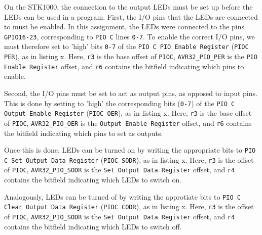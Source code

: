 On the STK1000, the connection to the output LEDs must be set up before the LEDs can be used in a program.
First, the I/O pins that the LEDs are connected to must be enabled.
In this assignment, the LEDs were connected to the pins \texttt{GPIO16-23}, corresponding to \texttt{PIO C} lines \texttt{0-7}.
To enable the correct I/O pins, we must therefore set to 'high' bits \texttt{0-7} of the \texttt{PIO C PIO Enable Register} (\texttt{PIOC PER}), as in listing x.
Here, \texttt{r3} is the base offset of \texttt{PIOC}, \texttt{AVR32\_PIO\_PER} is the \texttt{PIO Enable Register} offset, and \texttt{r6} contains the bitfield indicating which pins to enable.


Second, the I/O pins must be set to act as output pins, as opposed to input pins.
This is done by setting to 'high' the corresponding bits (\texttt{0-7}) of the \texttt{PIO C Output Enable Register} (\texttt{PIOC OER}), as in listing x.
Here, \texttt{r3} is the base offset of \texttt{PIOC}, \texttt{AVR32\_PIO\_OER} is the \texttt{Output Enable Register} offset, and \texttt{r6} contains the bitfield indicating which pins to set as outputs.


Once this is done, LEDs can be turned on by writing the appropriate bits to \texttt{PIO C Set Output Data Register} (\texttt{PIOC SODR}), as in listing x.
Here, \texttt{r3} is the offset of \texttt{PIOC}, \texttt{AVR32\_PIO\_SODR} is the \texttt{Set Output Data Register} offset, and \texttt{r4} contains the bitfield indicating which LEDs to switch on.


Analogously, LEDs can be turned of by writing the approtiate bits to \texttt{PIO C Clear Output Data Register} (\texttt{PIOC CODR}), as in listing x. 
Here, \texttt{r3} is the offset of \texttt{PIOC}, \texttt{AVR32\_PIO\_SODR} is the \texttt{Set Output Data Register} offset, and \texttt{r4} contains the bitfield indicating which LEDs to switch off.


